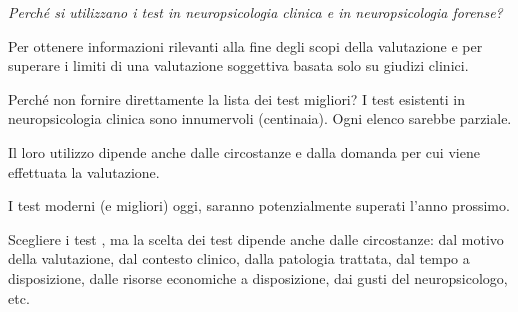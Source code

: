 \documentclass[
  ignorenonframetext,
]{beamer}
\begin{document}
\begin{frame}{}
\label{section}
\emph{Perché si utilizzano i test in neuropsicologia clinica e in
neuropsicologia forense?}

\pause

Per ottenere informazioni rilevanti alla fine degli scopi della
valutazione e per superare i limiti di una valutazione soggettiva basata
solo su giudizi clinici.
\end{frame}

\begin{frame}{Perché non fornire direttamente la lista dei test
migliori?}
\label{perchuxe9-non-fornire-direttamente-la-lista-dei-test-migliori}
I test esistenti in neuropsicologia clinica sono innumervoli
(centinaia). Ogni elenco sarebbe parziale.

Il loro utilizzo dipende anche dalle circostanze e dalla domanda per cui
viene effettuata la valutazione.

I test moderni (e migliori) oggi, saranno potenzialmente superati l'anno
prossimo.
\end{frame}

\begin{frame}{Scegliere i test}
\label{scegliere-i-test}
\setlength{\fboxrule}{1mm}
, ma la scelta dei test dipende anche  dalle circostanze: dal motivo della valutazione, dal contesto clinico, dalla patologia trattata, dal tempo a disposizione, dalle risorse economiche a disposizione, dai gusti del
neuropsicologo, etc.
\end{frame}
\end{document}
